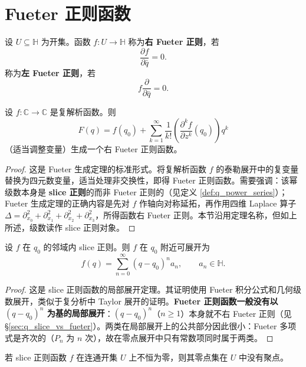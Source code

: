 \section{Fueter 正则函数}\label{sec:q_fueter_regular}

\begin{definition}\label{def:q_fueter_regular}
设 $U\subseteq\mathbb{H}$ 为开集。函数 $f:U\to\mathbb{H}$ 称为\textbf{右 Fueter 正则}，若
\[
\frac{\partial f}{\partial\bar q}=0.
\]
称为\textbf{左 Fueter 正则}，若
\[
f\frac{\partial}{\partial\bar q}=0.
\]
\end{definition}

\begin{theorem}[Fueter 定理]\label{thm:q_fueter_theorem}
设 $f:\mathbb{C}\to\mathbb{C}$ 是复解析函数。则
\[
F(q)=f(q_0)+\sum_{k=1}^\infty\frac{1}{k!}\left(\frac{\partial^k f}{\partial z^k}(q_0)\right)q^k
\]
（适当调整变量）生成一个右 Fueter 正则函数。
\end{theorem}

\begin{proof}
这是 Fueter 生成定理的标准形式。将复解析函数 $f$ 的泰勒展开中的复变量替换为四元数变量，适当处理非交换性，即得 Fueter 正则函数。需要强调：该幂级数本身是 \textbf{slice 正则}的而非 Fueter 正则的（见定义 \ref{def:q_power_series}）；Fueter 生成定理的正确内容是先对 $f$ 作轴向对称延拓，再作用四维 Laplace 算子 $\Delta=\partial_{x_0}^2+\partial_{x_1}^2+\partial_{x_2}^2+\partial_{x_3}^2$，所得函数右 Fueter 正则。本节沿用定理名称，但如上所述，级数读作 slice 正则对象。
\end{proof}

\begin{theorem}\label{thm:q_local_expansion}
设 $f$ 在 $q_0$ 的邻域内 slice 正则。则 $f$ 在 $q_0$ 附近可展开为
\[
f(q)=\sum_{n=0}^\infty (q-q_0)^n a_n,\qquad a_n\in\mathbb{H}.
\]
\end{theorem}

\begin{proof}
这是 slice 正则函数的局部展开定理。其证明使用 Fueter 积分公式和几何级数展开，类似于复分析中 Taylor 展开的证明。\textbf{Fueter 正则函数一般没有以 $(q-q_0)^n$ 为基的局部展开}：$(q-q_0)^n$（$n\ge 1$）本身就不右 Fueter 正则（见 \S\ref{sec:q_slice_vs_fueter}）。两类在局部展开上的公共部分因此很小：Fueter 多项式是齐次的（$P_n$ 为 $n$ 次），故在零点展开中只有常数项同时属于两类。
\end{proof}

\begin{corollary}\label{cor:q_zero_isolated}
若 slice 正则函数 $f$ 在连通开集 $U$ 上不恒为零，则其零点集在 $U$ 中没有聚点。
\end{corollary}

